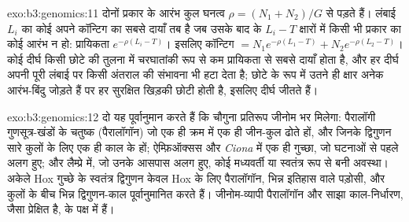 \begin{solution}{exo:b3:genomics:11}
दोनों प्रकार के आरंभ कुल घनत्व $\rho = (N_{1} +
N_{2})/G$ से पड़ते हैं। लंबाई $L_{i}$ का कोई  अपने कॉन्टिग का सबसे
दायाँ तब है जब उसके बाद के $L_{i} - T$ क्षारों में किसी भी प्रकार का
कोई  आरंभ न हो: प्रायिकता $e^{-\rho(L_{i} - T)}$। इसलिए कॉन्टिग $= N_{1}
e^{-\rho(L_{1} - T)} + N_{2} e^{-\rho(L_{2} - T)}$। कोई दीर्घ 
किसी छोटे  की तुलना में चरघातांकी रूप से कम प्रायिकता से सबसे दायाँ
होता है, और हर दीर्घ  अपनी पूरी लंबाई पर किसी अंतराल की संभावना भी
हटा देता है; छोटे  के रूप में उतने ही क्षार अनेक आरंभ-बिंदु
जोड़ते हैं पर हर सुरक्षित खिड़की छोटी होती है, इसलिए दीर्घ  जीतते हैं।
\end{solution}

\begin{solution}{exo:b3:genomics:12}
दो  यह पूर्वानुमान करते हैं कि चौगुना प्रतिरूप
जीनोम भर मिलेगा: पैरालॉगी गुणसूत्र-खंडों के चतुष्क (पैरालॉगॉन) जो एक ही
क्रम में एक ही जीन-कुल ढोते हों, और जिनके द्विगुणन सारे कुलों के लिए
एक ही काल के हों; ऐम्फ़िऑक्सस और \emph{Ciona} में एक ही गुच्छा, जो
घटनाओं से पहले अलग हुए; और लैम्प्रे में, जो उनके आसपास अलग हुए, कोई
मध्यवर्ती या स्वतंत्र रूप से बनी अवस्था। अकेले Hox गुच्छे के स्वतंत्र
द्विगुणन केवल Hox के लिए पैरालॉगॉन, भिन्न इतिहास वाले पड़ोसी, और कुलों
के बीच भिन्न द्विगुणन-काल पूर्वानुमानित करते हैं। जीनोम-व्यापी
पैरालॉगॉन और साझा काल-निर्धारण, जैसा प्रेक्षित है,  के पक्ष में हैं।
\end{solution}


